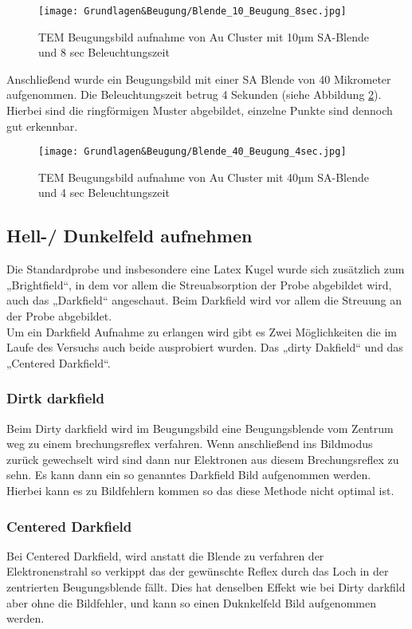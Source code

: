 \begin{figure}[htbp]
 \centering
 \texttt{[image: Grundlagen\&Beugung/Blende\_10\_Beugung\_8sec.jpg]}
 \caption[Beugungsbild Au 10µm Blede]{TEM Beugungsbild aufnahme von Au Cluster mit 10µm SA-Blende und 8 sec Beleuchtungszeit}
 \label{AU10um}
\end{figure}

Anschließend wurde ein Beugungsbild mit einer SA Blende von 40 Mikrometer aufgenommen. Die Beleuchtungszeit betrug 4 Sekunden (siehe Abbildung \cref{AU40um}). Hierbei sind die ringförmigen Muster abgebildet, einzelne Punkte sind dennoch gut erkennbar.

\begin{figure}[htbp]
 \centering
 \texttt{[image: Grundlagen\&Beugung/Blende\_40\_Beugung\_4sec.jpg]}
 \caption[Beugungsbild Au 40µm Blede]{TEM Beugungsbild aufnahme von Au Cluster mit 40µm SA-Blende und 4 sec Beleuchtungszeit}
 \label{AU40um}
\end{figure}

\subsection{Hell-/ Dunkelfeld aufnehmen}
Die Standardprobe und insbesondere eine Latex Kugel wurde sich zusätzlich zum „Brightfield“, in dem vor allem die Streuabsorption der Probe abgebildet wird, auch das „Darkfield“ angeschaut. Beim Darkfield wird vor allem die Streuung an der Probe abgebildet.\\ 
Um ein Darkfield Aufnahme zu erlangen wird gibt es Zwei Möglichkeiten die im Laufe des Versuchs auch beide ausprobiert wurden. Das „dirty Dakfield“ und das „Centered Darkfield“.
\subsubsection{Dirtk darkfield}
Beim Dirty darkfield wird im Beugungsbild eine Beugungsblende vom Zentrum weg zu einem brechungsreflex verfahren. Wenn anschließend ins Bildmodus zurück gewechselt wird sind dann nur Elektronen aus diesem Brechungsreflex zu sehn. Es kann dann ein so genanntes Darkfield Bild aufgenommen werden. Hierbei kann es zu Bildfehlern kommen so das diese Methode nicht optimal ist.

\subsubsection{Centered Darkfield}
Bei Centered Darkfield, wird anstatt die Blende zu verfahren der Elektronenstrahl so verkippt das der gewünschte Reflex durch das Loch in der zentrierten Beugungsblende fällt. Dies hat denselben Effekt wie bei Dirty darkfild aber ohne die Bildfehler, und kann so einen Duknkelfeld Bild aufgenommen werden.

